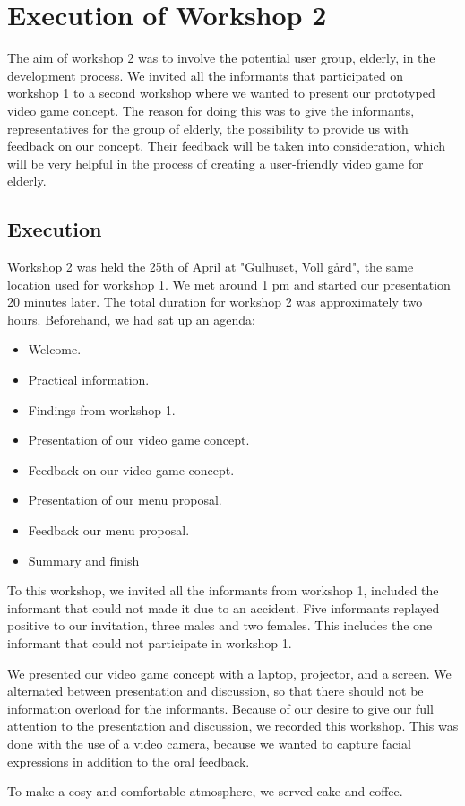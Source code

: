 \chapter{Execution of Workshop 2}
The aim of workshop 2 was to involve the potential user group, elderly, in the development process. We invited all the informants that participated on workshop 1 to a second workshop where we wanted to present our prototyped video game concept. The reason for doing this was to give the informants, representatives for the group of elderly, the possibility to provide us with feedback on our concept. Their feedback will be taken into consideration, which will be very helpful in the process of creating a user-friendly video game for elderly.  

\section{Execution}
Workshop 2 was held the 25th of April at "Gulhuset, Voll gård", the same location used for workshop 1. We met around 1 pm and started our presentation 20 minutes later. The total duration for workshop 2 was approximately two hours. Beforehand, we had sat up an agenda:

\begin{itemize}
\renewcommand{\labelitemi}{$\bullet$}
\item Welcome.
\item Practical information.
\item Findings from workshop 1.
\item Presentation of our video game concept.
\item Feedback on our video game concept.
\item Presentation of our menu proposal.
\item Feedback our menu proposal.
\item Summary and finish
\end{itemize}

To this workshop, we invited all the informants from workshop 1, included the informant that could not made it due to an accident. Five informants replayed positive to our invitation, three males and two females. This includes the one informant that could not participate in workshop 1. 

We presented our video game concept with a laptop, projector, and a screen. We alternated between presentation and discussion, so that there should not be information overload for the informants.
Because of our desire to give our full attention to the presentation and discussion, we recorded this workshop. This was done with the use of a video camera, because we wanted to capture facial expressions in addition to the oral feedback. 

To make a cosy and comfortable atmosphere, we served cake and coffee.   




